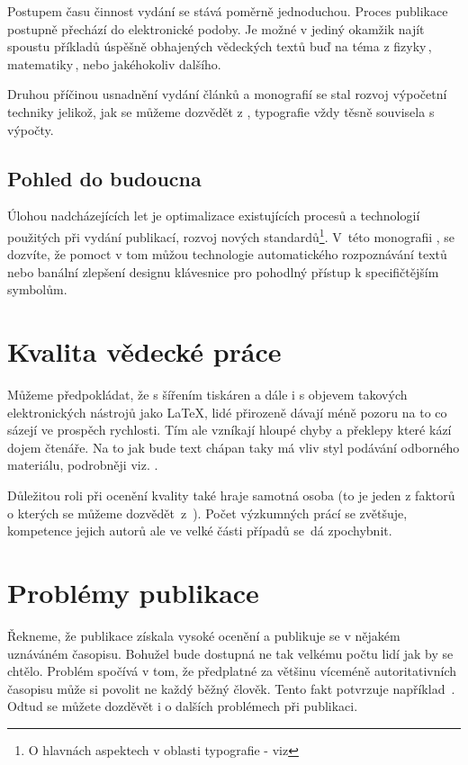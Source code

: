 \documentclass[a4paper,11pt,draft]{article}
\begin{document}
	Postupem času činnost vydání se stává poměrně jednoduchou. Proces publikace postupně přechází do elektronické podoby. Je možné v jediný okamžik najít spoustu příkladů úspěšně obhajených vědeckých textů buď na téma z fizyky\,\cite{TRAVNICEK2021thesis}, matematiky\,\cite{Trinh_Viet2020thesis}, nebo jakéhokoliv dalšího. 
	
	Druhou příčinou usnadnění vydání článků a monografií se stal rozvoj výpočetní techniky jelikož, jak se můžeme dozvědět z \cite{serpub}, typografie vždy těsně souvisela s výpočty.

	\subsection{Pohled do budoucna}
	
	Úlohou nadcházejících let je optimalizace existujících procesů a technologií použitých při vydání publikací, rozvoj nových standardů\footnote{O hlavnách aspektech v oblasti typografie - viz\;\cite{el3}}. V~této monografii \cite{mon2}, se dozvíte, že pomoct v tom můžou technologie automatického rozpoznávání textů nebo banální zlepšení designu klávesnice pro pohodlný přístup k specifičtějším symbolům.


	\section{Kvalita vědecké práce}
	
	Můžeme předpokládat, že s šířením tiskáren a dále i s objevem takových elektronických nástrojů jako \LaTeX, lidé přirozeně dávají méně pozoru na to co sázejí ve prospěch rychlosti. Tím ale vzníkají hloupé chyby a překlepy které kází dojem čtenáře. Na to jak bude text chápan taky má vliv styl podávání odborného materiálu, podrobněji viz. \cite{mon1}.
	
	Důležitou roli při ocenění kvality také hraje samotná osoba (to je jeden z faktorů o kterých se můžeme dozvědět~z~\cite{clserpub2}). Počet výzkumných prácí se zvětšuje, kompetence jejich autorů ale ve velké části případů se~dá zpochybnit.
	
	
	\section{Problémy publikace}
	
	Řekneme, že publikace získala vysoké ocenění a publikuje se v nějakém uznáváném časopisu. Bohužel bude dostupná ne tak velkému počtu lidí jak by se chtělo. Problém spočívá v tom, že předplatné za většinu víceméně autoritativních časopisu může si povolit ne každý běžný člověk. Tento fakt potvrzuje například~\cite{el1}. Odtud se můžete dozděvět i o dalších problémech při publikaci.

	
	
	
	
	\newpage
	
	
\end{document}
